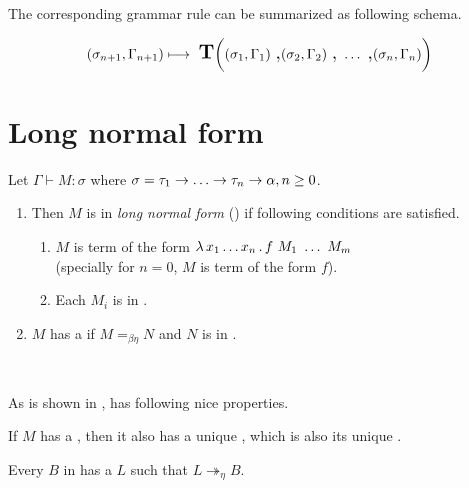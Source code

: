 \documentclass[12pt,a4paper]{report}
\newcommand{\turst}[3]{$#1\vdash{}#2:#3$\xspace}
\newcommand{\GMS}{\turst{\Gamma}{M}{\sigma}}
\begin{document}
The corresponding grammar rule can be summarized as following schema.

$$
 (\sigma_{n+1},\Gamma_{n+1})
 \longmapsto
 \mbox{ {\Large \textbf{T}}} 
 \bigg( 
 (\sigma_1,\Gamma_1)
 \mbox{ {\Large ,}}
 (\sigma_2,\Gamma_2)
 \mbox{ {\Large ,}}
 ~\dots
 \mbox{ {\Large ,}}
 (\sigma_n,\Gamma_n)
 \bigg)  
$$



	


\section{Long normal form}
\label{lnf}


\begin{definition}
Let \GMS where 
$\sigma = \tau_1 \ar \dots \ar \tau_n \ar \alpha, n \geq 0$.
	\begin{enumerate}
	  \item	
		Then $M$ is in \textit{long normal form} (\lnf) if following 
		conditions are satisfied.
		\begin{enumerate}
		 \item $M$ is term of the form $\lambda \, x_1 \dots x_n \, . \, f~M_1~\dots~M_m$\\
		  (specially for $n = 0$, $M$ is term of the form $f$).
		 \item Each $M_i$ is in \lnf.
		\end{enumerate}	
	  \item 
	    $M$ has a \lnf if $M =_{\beta\eta} N$ and $N$ is in \lnf.
	\end{enumerate}
\end{definition}~

As is shown in \cite{barendregt10}, \lnf has following nice properties.

\begin{proposition}
If $M$ has a \bnf, 
then it also has a unique \lnf, 
which is also its unique \beenf.
\end{proposition}

\begin{proposition}
Every $B$ in \bnf has a \lnf 
$L$ such that $L \twoheadrightarrow_{\eta} B$.
\end{proposition}
\end{document}
